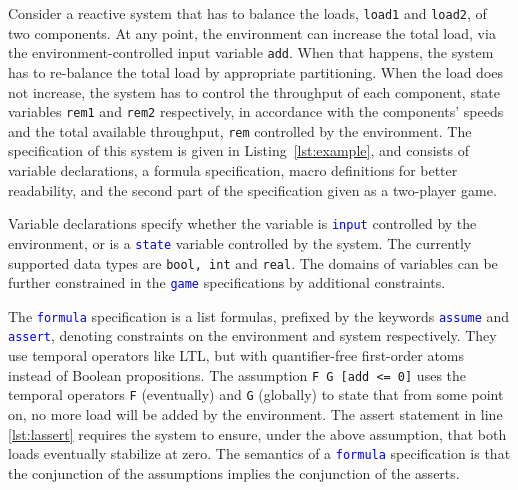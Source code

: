 \begin{example}\label{ex:simple-example}
Consider a reactive system that has to balance the loads, \texttt{load1} and \texttt{load2}, of two components.
At any point,  the environment can increase the total load,  via the environment-controlled input variable \texttt{add}.  When that happens,  the system has to re-balance the total load by appropriate partitioning. When the load does not increase,  the system has to control the throughput of each component,  state variables \texttt{rem1} and \texttt{rem2} respectively,  in accordance with the components' speeds and the total available throughput,  \texttt{rem} controlled by the environment.
The specification of this system is given in Listing~\ref{lst:example}, and consists of variable declarations,  a formula specification,   macro definitions for better readability, and the second part of the specification given as a two-player game.  


Variable declarations specify whether the variable is \texttt{\textcolor{blue}{input}} controlled by the environment, or is a \texttt{\textcolor{blue}{state}} variable controlled by the system.
The currently supported data types are \texttt{bool, int} and \texttt{real}.
The domains of variables can be further constrained in the \texttt{\textcolor{blue}{game}} specifications by additional constraints.




The \texttt{\textcolor{blue}{formula}} specification is a list \rpltl{} formulas,  prefixed by the keywords \texttt{\textcolor{blue}{assume}} and \texttt{\textcolor{blue}{assert}},  denoting constraints on the environment and system respectively.
They use temporal operators like LTL, but with quantifier-free first-order atoms 
instead of Boolean propositions.
The assumption \texttt{F G [add <= 0]} uses the temporal operators \texttt{F} (eventually) and  \texttt{G} (globally) to state that from some point on, no more load will be added by the environment.
The assert statement in line \ref{lst:lassert} requires the system to ensure, under the above assumption, that both loads eventually stabilize at zero. 
The semantics of a \texttt{\textcolor{blue}{formula}} specification is that the conjunction of the assumptions implies the conjunction of the asserts. 


\end{example}
